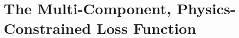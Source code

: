 \documentclass{article}
\newcommand{\authcomment}[1]{\textcolor{red}{\textbf{[#1]}}}
\begin{document}

\section{The Multi-Component, Physics-Constrained Loss Function}
\end{document}

